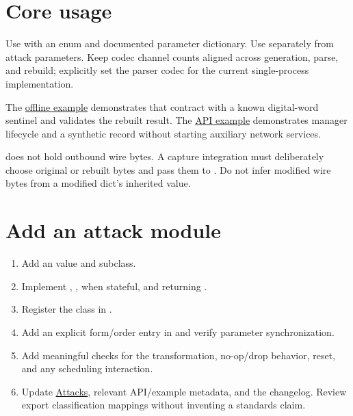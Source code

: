\section*{Core usage}
Use  with an  enum and documented parameter dictionary. Use  separately from attack parameters. Keep codec channel counts aligned across generation, parse, and rebuild; explicitly set the parser codec for the current single-process implementation.

The \hyperref[reference-files]{offline example} demonstrates that contract with a known digital-word sentinel and validates the rebuilt result. The \hyperref[reference-files]{API example} demonstrates manager lifecycle and a synthetic record without starting auxiliary network services.

 does not hold outbound wire bytes. A capture integration must deliberately choose original or rebuilt bytes and pass them to . Do not infer modified wire bytes from a modified dict's inherited  value.

\section*{Add an attack module}
\begin{enumerate}
\item Add an  value and  subclass.
\item Implement , ,  when stateful, and  returning .
\item Register the class in .
\item Add an explicit form/order entry in  and verify parameter synchronization.
\item Add meaningful checks for the transformation, no-op/drop behavior, reset, and any scheduling interaction.
\item Update \hyperref[chapter-6]{Attacks}, relevant API/example metadata, and the changelog. Review export classification mappings without inventing a standards claim.
\end{enumerate}

